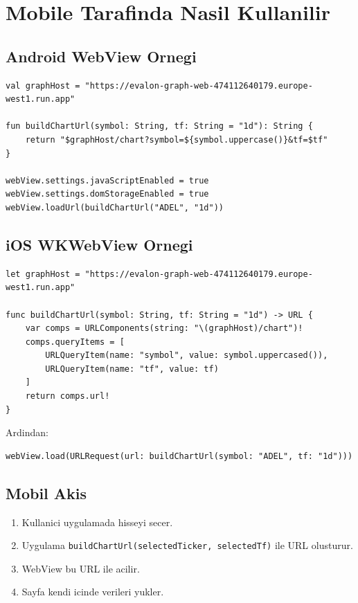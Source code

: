 \documentclass[11pt,a4paper]{article}
\begin{document}
\section{Mobile Tarafinda Nasil Kullanilir}

\subsection{Android WebView Ornegi}

\begin{lstlisting}[style=evalon]
val graphHost = "https://evalon-graph-web-474112640179.europe-west1.run.app"

fun buildChartUrl(symbol: String, tf: String = "1d"): String {
    return "$graphHost/chart?symbol=${symbol.uppercase()}&tf=$tf"
}

webView.settings.javaScriptEnabled = true
webView.settings.domStorageEnabled = true
webView.loadUrl(buildChartUrl("ADEL", "1d"))
\end{lstlisting}

\subsection{iOS WKWebView Ornegi}

\begin{lstlisting}[style=evalon]
let graphHost = "https://evalon-graph-web-474112640179.europe-west1.run.app"

func buildChartUrl(symbol: String, tf: String = "1d") -> URL {
    var comps = URLComponents(string: "\(graphHost)/chart")!
    comps.queryItems = [
        URLQueryItem(name: "symbol", value: symbol.uppercased()),
        URLQueryItem(name: "tf", value: tf)
    ]
    return comps.url!
}
\end{lstlisting}

Ardindan:

\begin{lstlisting}[style=evalon]
webView.load(URLRequest(url: buildChartUrl(symbol: "ADEL", tf: "1d")))
\end{lstlisting}

\subsection{Mobil Akis}

\begin{enumerate}
  \item Kullanici uygulamada hisseyi secer.
  \item Uygulama \texttt{buildChartUrl(selectedTicker, selectedTf)} ile URL olusturur.
  \item WebView bu URL ile acilir.
  \item Sayfa kendi icinde verileri yukler.
\end{enumerate}
\end{document}
